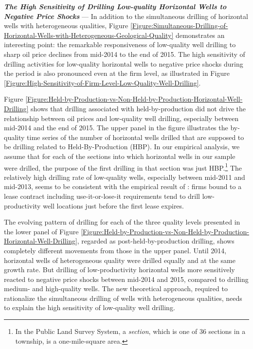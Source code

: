 \par
\vspace{0.3cm}
\noindent
\textit{\textbf{The High Sensitivity of Drilling Low-quality Horizontal Wells to Negative Price Shocks}} --- In addition to the simultaneous drilling of horizontal wells with heterogeneous qualities, Figure \ref{Figure:Simultaneous-Drilling-of-Horizontal-Wells-with-Heterogeneous-Geological-Quality} demonstrates an interesting point: the remarkable responsiveness of low-quality well drilling to sharp oil price declines from mid-2014 to the end of 2015. The high sensitivity of drilling activities for low-quality horizontal wells to negative price shocks during the period is also pronounced even at the firm level, as illustrated in Figure \ref{Figure:High-Sensitivity-of-Firm-Level-Low-Quality-Well-Drilling}. 

Figure \ref{Figure:Held-by-Production-vs-Non-Held-by-Production-Horizontal-Well-Drilling} shows that drilling associated with held-by-production did not drive the relationship between oil prices and low-quality well drilling, especially between mid-2014 and the end of 2015. The upper panel in the figure illustrates the by-quality time series of the number of horizontal wells drilled that are supposed to be drilling related to Held-By-Production (HBP). In our empirical analysis, we assume that for each of the sections into which horizontal wells in our sample were drilled, the purpose of the first drilling in that section was just HBP.\footnote{In the Public Land Survey System, a \textit{section}, which is one of 36 sections in a township, is a one-mile-square area.} The relatively high drilling rate of low-quality wells, especially between mid-2011 and mid-2013, seems to be consistent with the empirical result of \cite{The-Economics-of-Time-Limited-Development-Options_2020_Herrnstadt-Kellogg-and-Lewis}: firms bound to a lease contract including use-it-or-lose-it requirements tend to drill low-productivity well locations just before the first lease expires.

The evolving pattern of drilling for each of the three quality levels presented in the lower panel of Figure \ref{Figure:Held-by-Production-vs-Non-Held-by-Production-Horizontal-Well-Drilling}, regarded as post-held-by-production drilling, shows completely different movements from those in the upper panel. Until 2014, horizontal wells of heterogeneous quality were drilled equally and at the same growth rate. But drilling of low-productivity horizontal wells more sensitively reacted to negative price shocks between mid-2014 and 2015, compared to drilling medium- and high-quality wells. The new theoretical approach, required to rationalize the simultaneous drilling of wells with heterogeneous qualities, needs to explain the high sensitivity of low-quality well drilling.